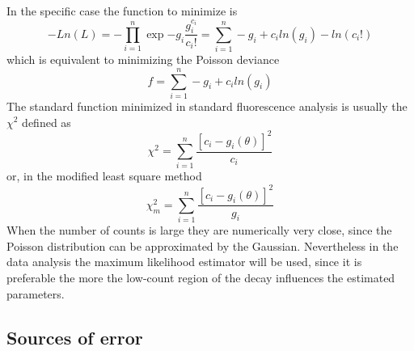 In the specific case the function to minimize is
\begin{equation}
-Ln(L) = - \prod _{i=1}^{n} \exp{-g_{i}} \frac{g_{i}^{c_i}}{c_{i}!} = \sum _{i=1}^{n} -g_{i} + c_{i}ln(g_{i}) - ln(c_{i}!)
\end{equation}
which is equivalent to minimizing the Poisson deviance\cite{Bajzer1991}
\begin{equation}
f = \sum _{i=1}^{n} -g_{i} + c_{i}ln(g_{i})
\end{equation}
The standard function minimized in standard fluorescence analysis is usually the $\chi ^{2}$ defined as
\begin{equation}
\chi ^{2} = \sum _{i=1}^{n} \frac{\left[ c_{i} - g_{i}(\theta) \right] ^{2}}{c_{i}}
\end{equation}
or, in the modified least square method\cite{Bajzer1991}
\begin{equation}
\chi _{m}^{2} = \sum _{i=1}^{n} \frac{\left[ c_{i} - g_{i}(\theta) \right] ^{2}}{g_{i}}
\end{equation}
When the number of counts is large they are numerically very close, since the Poisson distribution can be approximated by the Gaussian. Nevertheless in the data analysis the maximum likelihood estimator will be used, since it is preferable the more the low-count region of the decay influences the estimated parameters\cite{Bajzer1991}. 

\subsection{Sources of error}

%
%
%
%
%
%
%


